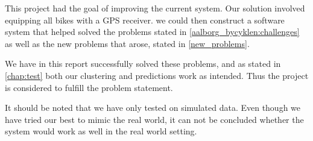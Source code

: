 This project had the goal of improving the current \citybike system.
Our solution involved equipping all bikes with a GPS receiver. we could then construct a software system that helped solved the problems stated in \ref{aalborg_bycyklen:challenges} as well as the new problems that arose, stated in \ref{new_problems}.

We have in this report successfully solved these problems, and as stated in \ref{chap:test} both our clustering and predictions work as intended.
Thus the project is considered to fulfill the problem statement.

It should be noted that we have only tested on simulated data.
Even though we have tried our best to mimic the real world, it can not be concluded whether the system would work as well in the real world setting.